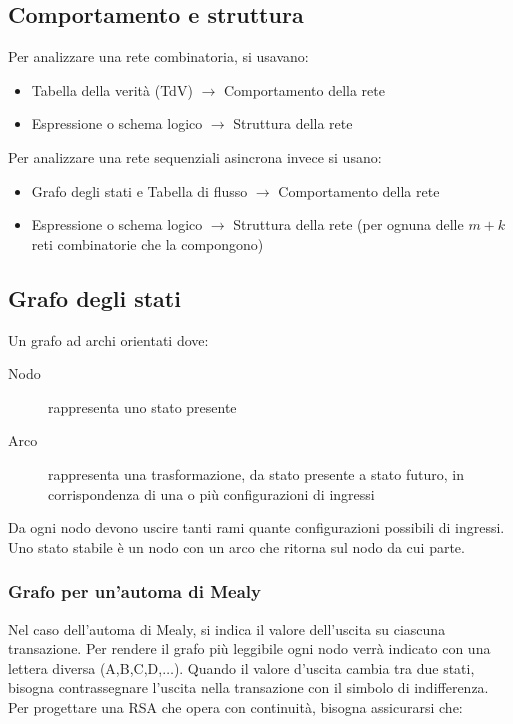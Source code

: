 \documentclass{article}
\begin{document}
\subsection{Comportamento e struttura}

Per analizzare una rete combinatoria, si usavano:

\begin{itemize}
    \item Tabella della verità (TdV) $\to$ Comportamento della rete
    \item Espressione o schema logico $\to$ Struttura della rete
\end{itemize}

\noindent
Per analizzare una rete sequenziali asincrona invece si usano:

\begin{itemize}
    \item Grafo degli stati e Tabella di flusso $\to$ Comportamento della rete
    \item Espressione o schema logico $\to$ Struttura della rete (per ognuna delle $m+k$ reti combinatorie che la compongono)
\end{itemize}

\subsection{Grafo degli stati}

Un grafo ad archi orientati dove:

\begin{description}
    \item[Nodo] rappresenta uno stato presente
    \item[Arco] rappresenta una trasformazione, da stato presente a stato futuro, in corrispondenza di una o più configurazioni di ingressi
\end{description}

\noindent
Da ogni nodo devono uscire tanti rami quante configurazioni possibili di ingressi.
Uno stato stabile è un nodo con un arco che ritorna sul nodo da cui parte.

\subsubsection{Grafo per un'automa di Mealy}

Nel caso dell'automa di Mealy, si indica il valore dell'uscita su ciascuna transazione.
Per rendere il grafo più leggibile ogni nodo verrà indicato con una lettera diversa (A,B,C,D,$\dots$).
Quando il valore d'uscita cambia tra due stati, bisogna contrassegnare l'uscita nella transazione con il simbolo di indifferenza. Per progettare una RSA che opera con continuità, bisogna assicurarsi che:
\end{document}
